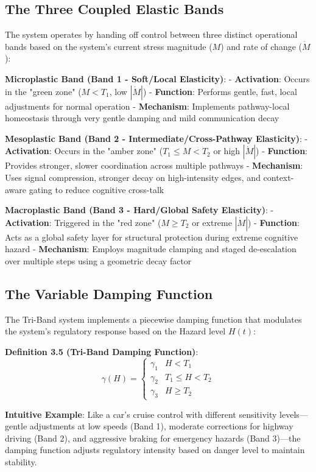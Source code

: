 \documentclass[12pt,a4paper]{report}
\begin{document}
\subsection{The Three Coupled Elastic Bands}

The system operates by handing off control between three distinct operational bands based on the system's current stress magnitude ($M$) and rate of change ($\dot{M}$):

\textbf{Microplastic Band (Band 1 - Soft/Local Elasticity)}:
- \textbf{Activation}: Occurs in the "green zone" ($M < T_1$, low $|\dot{M}|$)
- \textbf{Function}: Performs gentle, fast, local adjustments for normal operation
- \textbf{Mechanism}: Implements pathway-local homeostasis through very gentle damping and mild communication decay

\textbf{Mesoplastic Band (Band 2 - Intermediate/Cross-Pathway Elasticity)}:
- \textbf{Activation}: Occurs in the "amber zone" ($T_1 \leq M < T_2$ or high $|\dot{M}|$)
- \textbf{Function}: Provides stronger, slower coordination across multiple pathways
- \textbf{Mechanism}: Uses signal compression, stronger decay on high-intensity edges, and context-aware gating to reduce cognitive cross-talk

\textbf{Macroplastic Band (Band 3 - Hard/Global Safety Elasticity)}:
- \textbf{Activation}: Triggered in the "red zone" ($M \geq T_2$ or extreme $|\dot{M}|$)
- \textbf{Function}: Acts as a global safety layer for structural protection during extreme cognitive hazard
- \textbf{Mechanism}: Employs magnitude clamping and staged de-escalation over multiple steps using a geometric decay factor

\subsection{The Variable Damping Function}

The Tri-Band system implements a piecewise damping function that modulates the system's regulatory response based on the Hazard level $H(t)$:

\textbf{Definition 3.5 (Tri-Band Damping Function)}:
\[\gamma(H) = \begin{cases} 
\gamma_1 & H < T_1 \\
\gamma_2 & T_1 \leq H < T_2 \\
\gamma_3 & H \geq T_2 
\end{cases}\]

\textbf{Intuitive Example}: Like a car's cruise control with different sensitivity levels—gentle adjustments at low speeds (Band 1), moderate corrections for highway driving (Band 2), and aggressive braking for emergency hazards (Band 3)—the damping function adjusts regulatory intensity based on danger level to maintain stability.
\end{document}
